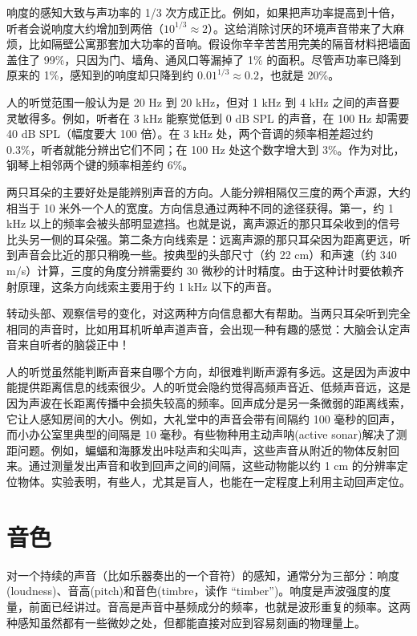 响度的感知大致与声功率的 1/3
次方成正比。例如，如果把声功率提高到十倍，听者会说响度大约增加到两倍（\(10^{1/3} \approx 2\)）。这给消除讨厌的环境声音带来了大麻烦，比如隔壁公寓那套加大功率的音响。假设你辛辛苦苦用完美的隔音材料把墙面盖住了
99\%，只因为门、墙角、通风口等漏掉了 1\% 的面积。尽管声功率已降到原来的
1\%，感知到的响度却只降到约 \(0.01^{1/3} \approx 0.2\)，也就是 20\%。

人的听觉范围一般认为是 20 Hz 到 20 kHz，但对 1 kHz 到 4 kHz
之间的声音要灵敏得多。例如，听者在 3 kHz 能察觉低到 0 dB SPL 的声音，在
100 Hz 却需要 40 dB SPL（幅度要大 100 倍）。在 3 kHz
处，两个音调的频率相差超过约 0.3\%，听者就能分辨出它们不同；在 100 Hz
处这个数字增大到 3\%。作为对比，钢琴上相邻两个键的频率相差约 6\%。

两只耳朵的主要好处是能辨别声音的方向。人能分辨相隔仅三度的两个声源，大约相当于
10 米外一个人的宽度。方向信息通过两种不同的途径获得。第一，约 1 kHz
以上的频率会被头部明显遮挡。也就是说，离声源近的那只耳朵收到的信号比头另一侧的耳朵强。第二条方向线索是：远离声源的那只耳朵因为距离更远，听到声音会比近的那只稍晚一些。按典型的头部尺寸（约
22 cm）和声速（约 340 m/s）计算，三度的角度分辨需要约 30
微秒的计时精度。由于这种计时要依赖齐射原理，这条方向线索主要用于约 1 kHz
以下的声音。

转动头部、观察信号的变化，对这两种方向信息都大有帮助。当两只耳朵听到完全相同的声音时，比如用耳机听单声道声音，会出现一种有趣的感觉：大脑会认定声音来自听者的脑袋正中！

人的听觉虽然能判断声音来自哪个方向，却很难判断声源有多远。这是因为声波中能提供距离信息的线索很少。人的听觉会隐约觉得高频声音近、低频声音远，这是因为声波在长距离传播中会损失较高的频率。回声成分是另一条微弱的距离线索，它让人感知房间的大小。例如，大礼堂中的声音会带有间隔约
100 毫秒的回声，而小办公室里典型的间隔是 10
毫秒。有些物种用主动声呐(active
sonar)解决了测距问题。例如，蝙蝠和海豚发出咔哒声和尖叫声，这些声音从附近的物体反射回来。通过测量发出声音和收到回声之间的间隔，这些动物能以约
1 cm
的分辨率定位物体。实验表明，有些人，尤其是盲人，也能在一定程度上利用主动回声定位。

\section{音色}

对一个持续的声音（比如乐器奏出的一个音符）的感知，通常分为三部分：响度(loudness)、音高(pitch)和音色(timbre，读作
``timber'')。响度是声波强度的度量，前面已经讲过。音高是声音中基频成分的频率，也就是波形重复的频率。这两种感知虽然都有一些微妙之处，但都能直接对应到容易刻画的物理量上。


